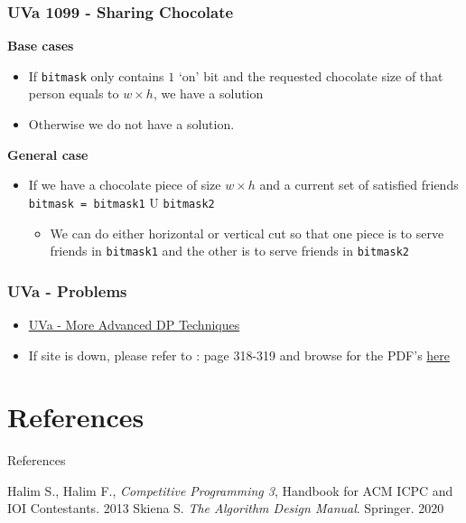 \documentclass{beamer}
\begin{document}
\begin{frame}[fragile]
\frametitle{UVa 1099 - Sharing Chocolate}

\textbf{Base cases}

\begin{itemize}
    \item If \verb|bitmask| only contains $1$ ‘on’ bit and the requested chocolate size of that person equals to $w \times h$, we have a solution
    \item Otherwise we do not have a solution.
\end{itemize}

\vspace{0.3cm}

\textbf{General case}

\begin{itemize}
    \item If we have a chocolate piece of size $w \times h$ and a current set of satisfied friends \verb|bitmask = bitmask1| U \verb|bitmask2|
    	\begin{itemize}
		    \item We can do either horizontal or vertical cut so that one piece is to serve friends in \verb|bitmask1| and the other is to serve friends in \verb|bitmask2|
		\end{itemize}
\end{itemize}

\end{frame}

\begin{frame}[fragile]
\frametitle{UVa - Problems}

\begin{itemize}
    \item \href{https://onlinejudge.org/index.php?option=com_onlinejudge&Itemid=8&category=778}{UVa - More Advanced DP Techniques}
    \item If site is down, please refer to \cite{Halim}: page 318-319 and browse for the PDF's \href{https://cpbook.net/methodstosolve}{here}
\end{itemize}

\end{frame}


\section*{References}
\begin{frame}{References}
    \begin{thebibliography}{}
         Halim S., Halim F., \textit{Competitive Programming 3}, Handbook for ACM ICPC and IOI Contestants. 2013
         Skiena S. \textit{The Algorithm Design Manual}. Springer. 2020
    \end{thebibliography}
\end{frame}
\end{document}
